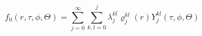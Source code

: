 \begin{equation}
f_0(r,\tau ,\phi ,\Theta
)=\sum\limits_{j=0}^\infty\sum\limits_{k,l=0}^j\lambda^{kl}_j\varrho^{kl}_j(r)
Y^{kl}_j(\tau, \phi ,\Theta )
\label{eloallitas}
\end{equation}

